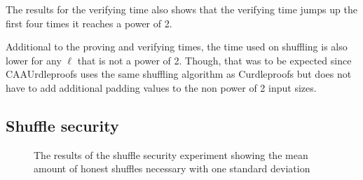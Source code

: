 The results for the verifying time also shows that the verifying time jumps up the first four times it reaches a power of 2.

Additional to the proving and verifying times, the time used on shuffling is also lower for any $\ell$ that is not a power of 2.
Though, that was to be expected since CAAUrdleproofs uses the same shuffling algorithm as Curdleproofs but does not have to add additional padding values to the non power of 2 input sizes.



\subsection{Shuffle security}\label{subsec:Shuffle-security}

\begin{figure}[!htb]
    \centering
    \qquad
    \caption{The results of the shuffle security experiment showing the mean amount of honest shuffles necessary with one standard deviation}%
    \label{fig:shufflesecurity}%
\end{figure}

